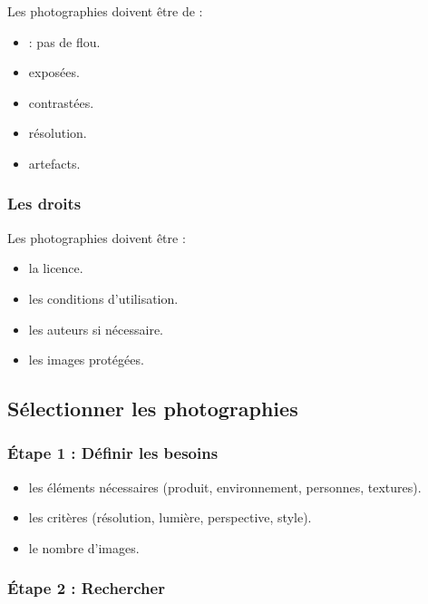 Les photographies doivent être de  :

\begin{itemize}
    \item {} : pas de flou.
    \item {} exposées.
    \item {} contrastées.
    \item {} résolution.
    \item {} artefacts.
\end{itemize}

\subsubsection{Les droits}

Les photographies doivent être  :

\begin{itemize}
    \item {} la licence.
    \item {} les conditions d'utilisation.
    \item {} les auteurs si nécessaire.
    \item {} les images protégées.
\end{itemize}

\subsection{Sélectionner les photographies}

\subsubsection{Étape 1 : Définir les besoins}

\begin{itemize}
    \item {} les éléments nécessaires (produit, environnement, personnes, textures).
    \item {} les critères (résolution, lumière, perspective, style).
    \item {} le nombre d'images.
\end{itemize}

\subsubsection{Étape 2 : Rechercher}

